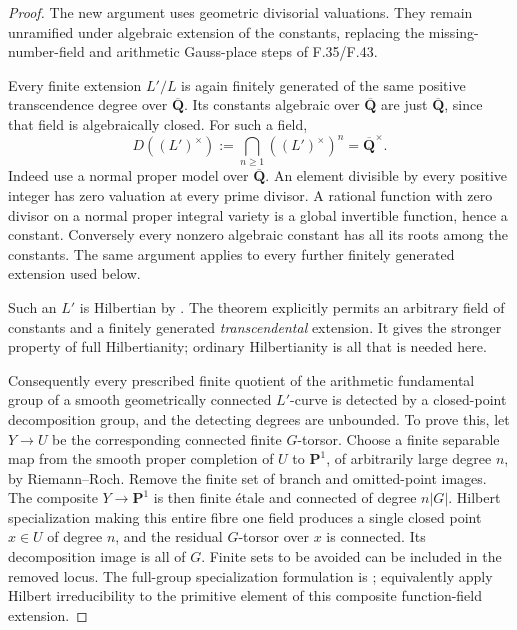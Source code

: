 \begin{proof}
The new argument uses geometric divisorial valuations. They remain
unramified under algebraic extension of the constants, replacing the
missing-number-field and arithmetic Gauss-place steps of F.35/F.43.


Every finite extension \(L'/L\) is again finitely generated of the same
positive transcendence degree over \(\overline{\mathbf Q}\). Its constants
algebraic over \(\overline{\mathbf Q}\) are just
\(\overline{\mathbf Q}\), since that field is algebraically closed. For
such a field,
\[
 D((L')^\times):=\bigcap_{n\ge1}((L')^\times)^n
       =\overline{\mathbf Q}^{\times}.                 \tag{F.45.1}
\]
Indeed use a normal proper model over \(\overline{\mathbf Q}\). An element
divisible by every positive integer has zero valuation at every prime
divisor. A rational function with zero divisor on a normal proper integral
variety is a global invertible function, hence a constant. Conversely every
nonzero algebraic constant has all its roots among the constants. The same
argument applies to every further finitely generated extension used below.

Such an \(L'\) is Hilbertian by \citet[Theorem~1.2 and Corollary~3.2, author pp.~2,16]{F_BarySorokerParan2013}. The theorem
explicitly permits an arbitrary field of constants and a finitely
generated \emph{transcendental} extension. It gives the stronger property of
full Hilbertianity; ordinary Hilbertianity is all that is needed here.

Consequently every prescribed finite quotient of the arithmetic
fundamental group of a smooth geometrically connected \(L'\)-curve is
detected by a closed-point decomposition group, and the detecting degrees
are unbounded. To prove this, let \(Y\to U\) be the corresponding connected
finite \(G\)-torsor. Choose a finite separable map from the smooth proper
completion of \(U\) to \(\mathbf P^1\), of arbitrarily large degree
\(n\), by Riemann–Roch. Remove the finite set of branch and omitted-point
images. The composite \(Y\to\mathbf P^1\) is then finite étale and
connected of degree \(n|G|\). Hilbert specialization making this entire
fibre one field produces a single closed point \(x\in U\) of degree
\(n\), and the residual \(G\)-torsor over \(x\) is connected. Its
decomposition image is all of \(G\). Finite sets to be avoided can be
included in the removed locus. The full-group specialization formulation
is \citet[Proposition~3.3.1]{F_Serre2007}; equivalently apply Hilbert irreducibility to
the primitive element of this composite function-field extension.


\end{proof}
